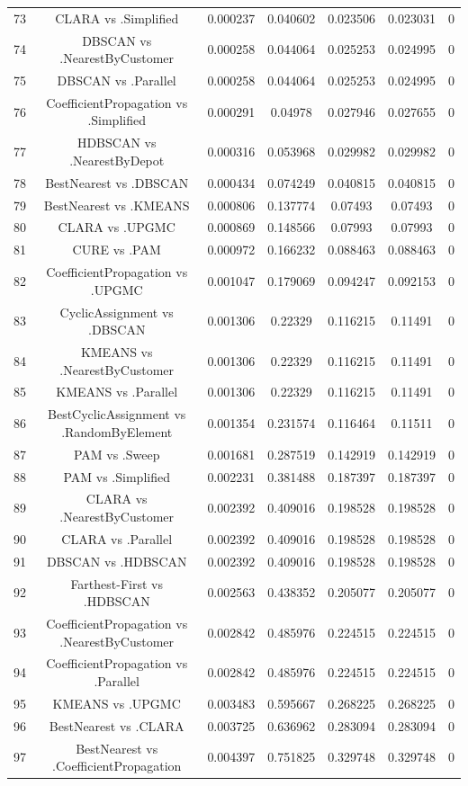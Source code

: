 \documentclass[a4paper,10pt]{article}
\begin{document}
\begin{landscape}
\begin{table}[!htp]
\begin{tabular}{ccccccc}
73&CLARA vs .Simplified&0.000237&0.040602&0.023506&0.023031&0\\
74&DBSCAN vs .NearestByCustomer&0.000258&0.044064&0.025253&0.024995&0\\
75&DBSCAN vs .Parallel&0.000258&0.044064&0.025253&0.024995&0\\
76&CoefficientPropagation vs .Simplified&0.000291&0.04978&0.027946&0.027655&0\\
77&HDBSCAN vs .NearestByDepot&0.000316&0.053968&0.029982&0.029982&0\\
78&BestNearest vs .DBSCAN&0.000434&0.074249&0.040815&0.040815&0\\
79&BestNearest vs .KMEANS&0.000806&0.137774&0.07493&0.07493&0\\
80&CLARA vs .UPGMC&0.000869&0.148566&0.07993&0.07993&0\\
81&CURE vs .PAM&0.000972&0.166232&0.088463&0.088463&0\\
82&CoefficientPropagation vs .UPGMC&0.001047&0.179069&0.094247&0.092153&0\\
83&CyclicAssignment vs .DBSCAN&0.001306&0.22329&0.116215&0.11491&0\\
84&KMEANS vs .NearestByCustomer&0.001306&0.22329&0.116215&0.11491&0\\
85&KMEANS vs .Parallel&0.001306&0.22329&0.116215&0.11491&0\\
86&BestCyclicAssignment vs .RandomByElement&0.001354&0.231574&0.116464&0.11511&0\\
87&PAM vs .Sweep&0.001681&0.287519&0.142919&0.142919&0\\
88&PAM vs .Simplified&0.002231&0.381488&0.187397&0.187397&0\\
89&CLARA vs .NearestByCustomer&0.002392&0.409016&0.198528&0.198528&0\\
90&CLARA vs .Parallel&0.002392&0.409016&0.198528&0.198528&0\\
91&DBSCAN vs .HDBSCAN&0.002392&0.409016&0.198528&0.198528&0\\
92&Farthest-First vs .HDBSCAN&0.002563&0.438352&0.205077&0.205077&0\\
93&CoefficientPropagation vs .NearestByCustomer&0.002842&0.485976&0.224515&0.224515&0\\
94&CoefficientPropagation vs .Parallel&0.002842&0.485976&0.224515&0.224515&0\\
95&KMEANS vs .UPGMC&0.003483&0.595667&0.268225&0.268225&0\\
96&BestNearest vs .CLARA&0.003725&0.636962&0.283094&0.283094&0\\
97&BestNearest vs .CoefficientPropagation&0.004397&0.751825&0.329748&0.329748&0\\

\end{tabular}
\end{table}
\end{landscape}
\end{document}
